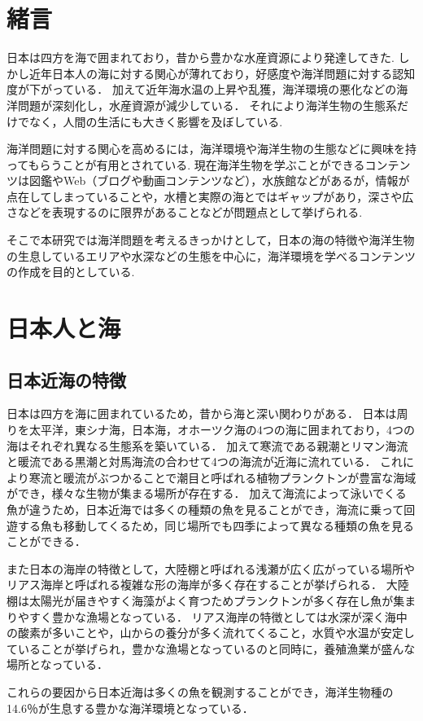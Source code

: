 \documentclass[12pt,a4j,titlepage]{ltjsarticle}
\begin{document}
\section{緒言}\label{緒言}
日本は四方を海で囲まれており，昔から豊かな水産資源により発達してきた.
しかし近年日本人の海に対する関心が薄れており，好感度や海洋問題に対する認知度が下がっている．
加えて近年海水温の上昇や乱獲，海洋環境の悪化などの海洋問題が深刻化し，水産資源が減少している．
それにより海洋生物の生態系だけでなく，人間の生活にも大きく影響を及ぼしている.\par
海洋問題に対する関心を高めるには，海洋環境や海洋生物の生態などに興味を持ってもらうことが有用とされている.
現在海洋生物を学ぶことができるコンテンツは図鑑やWeb（ブログや動画コンテンツなど），水族館などがあるが，情報が点在してしまっていることや，水槽と実際の海とではギャップがあり，深さや広さなどを表現するのに限界があることなどが問題点として挙げられる.\par
そこで本研究では海洋問題を考えるきっかけとして，日本の海の特徴や海洋生物の生息しているエリアや水深などの生態を中心に，海洋環境を学べるコンテンツの作成を目的としている.

\clearpage

\section{日本人と海}\label{人と海}

\subsection{日本近海の特徴}
日本は四方を海に囲まれているため，昔から海と深い関わりがある．
日本は周りを太平洋，東シナ海，日本海，オホーツク海の4つの海に囲まれており，4つの海はそれぞれ異なる生態系を築いている．
加えて寒流である親潮とリマン海流と暖流である黒潮と対馬海流の合わせて4つの海流が近海に流れている．
これにより寒流と暖流がぶつかることで潮目と呼ばれる植物プランクトンが豊富な海域ができ，様々な生物が集まる場所が存在する．
加えて海流によって泳いでくる魚が違うため，日本近海では多くの種類の魚を見ることができ，海流に乗って回遊する魚も移動してくるため，同じ場所でも四季によって異なる種類の魚を見ることができる．\par
また日本の海岸の特徴として，大陸棚と呼ばれる浅瀬が広く広がっている場所やリアス海岸と呼ばれる複雑な形の海岸が多く存在することが挙げられる．
大陸棚は太陽光が届きやすく海藻がよく育つためプランクトンが多く存在し魚が集まりやすく豊かな漁場となっている．
リアス海岸の特徴としては水深が深く海中の酸素が多いことや，山からの養分が多く流れてくること，水質や水温が安定していることが挙げられ，豊かな漁場となっているのと同時に，養殖漁業が盛んな場所となっている．\par
これらの要因から日本近海は多くの魚を観測することができ，海洋生物種の14.6％が生息する豊かな海洋環境となっている．
\end{document}
